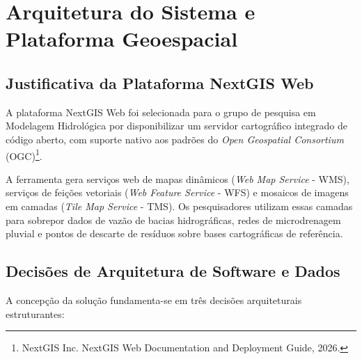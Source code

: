 
\chapter{Arquitetura do Sistema e Plataforma Geoespacial}
\label{cap:arquitetura_sistema}

\section{Justificativa da Plataforma NextGIS Web}

A plataforma NextGIS Web foi selecionada para o grupo de pesquisa em Modelagem Hidrológica por disponibilizar um servidor cartográfico integrado de código aberto, com suporte nativo aos padrões do \textit{Open Geospatial Consortium} (OGC)\footnote{NextGIS Inc. NextGIS Web Documentation and Deployment Guide, 2026.}.

A ferramenta gera serviços web de mapas dinâmicos (\textit{Web Map Service} - WMS), serviços de feições vetoriais (\textit{Web Feature Service} - WFS) e mosaicos de imagens em camadas (\textit{Tile Map Service} - TMS). Os pesquisadores utilizam essas camadas para sobrepor dados de vazão de bacias hidrográficas, redes de microdrenagem pluvial e pontos de descarte de resíduos sobre bases cartográficas de referência.

\section{Decisões de Arquitetura de Software e Dados}

A concepção da solução fundamenta-se em três decisões arquiteturais estruturantes:

